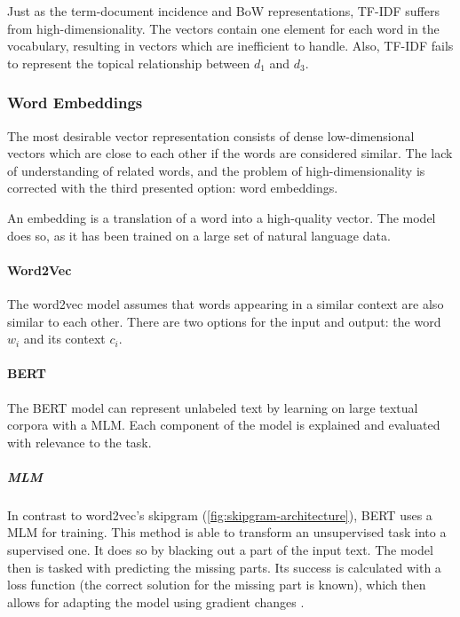             Just as the term-document incidence and \ac{BoW} representations, \ac{TF-IDF} suffers from high-dimensionality. The vectors contain one element for each word in the vocabulary, resulting in vectors which are inefficient to handle.
            Also, \ac{TF-IDF} fails to represent the topical relationship between $ d_{1} $ and $ d_{3}$. 
            
            \subsubsection{Word Embeddings}
             The most desirable vector representation consists of dense low-dimensional vectors which are close to each other if the words are considered similar. The lack of understanding of related words, and the problem of high-dimensionality is corrected with the third presented option: word embeddings.
            
            An embedding is a translation of a word into a high-quality vector. The model does so, as it has been trained on a large set of natural language data. 
            
            \paragraph{Word2Vec}
            The word2vec model assumes that words appearing in a similar context are also similar to each other. There are two options for the input and output: the word $w_i$ and its context $c_i$.
            
            
           
            
            \paragraph{BERT} The \ac{BERT} model can represent unlabeled text by learning on large textual corpora with a \ac{MLM}. Each component of the model is explained and evaluated with relevance to the task.
            
            \subparagraph{\acl{MLM}} In contrast to word2vec's skipgram (\ref{fig:skipgram-architecture}), \ac{BERT} uses a \ac{MLM} for training. This method is able to transform an unsupervised task into a supervised one. It does so by blacking out a part of the input text. The model then is tasked with predicting the missing parts. Its success is calculated with a loss function (the correct solution for the missing part is known), which then allows for adapting the model using gradient changes \cite{MLM}. 
         
